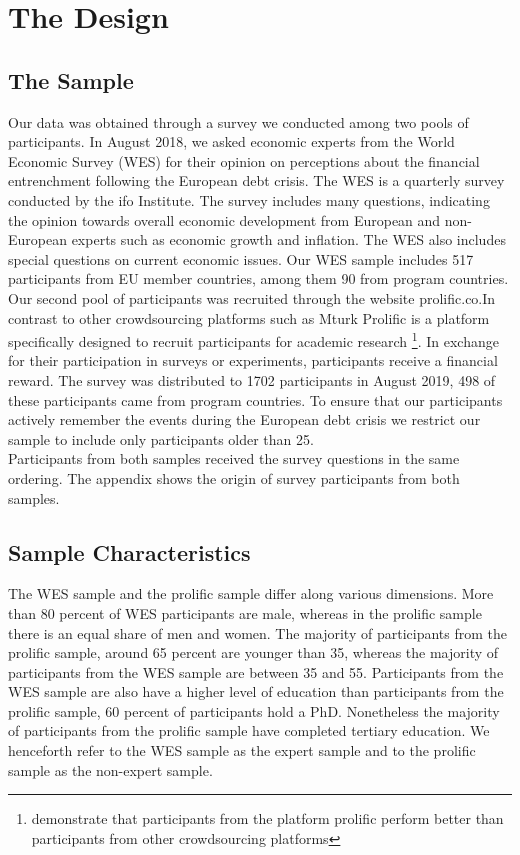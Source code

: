 \section{The Design}
\subsection{The Sample}
Our data was obtained through a survey we conducted among two pools of participants. In August 2018, we asked economic experts from the World Economic Survey (WES) for their opinion on perceptions about the financial entrenchment following the European debt crisis. The WES is a quarterly survey conducted by the ifo Institute. The survey includes many  questions, indicating the opinion towards overall economic development from European and non-European  experts such as economic growth and inflation. The WES also includes special questions on current economic issues. Our WES sample includes 517 participants from EU member countries, among them 90 from program countries.
\\
Our second pool of participants was recruited through the website prolific.co.In contrast to other crowdsourcing platforms such as Mturk Prolific is a platform specifically designed to recruit participants for academic research \footnote{\cite{Peer} demonstrate that participants from the platform prolific perform better than participants from other crowdsourcing platforms}. In exchange for their participation in surveys or experiments, participants receive a financial reward. The survey was distributed to 1702 participants in August 2019, 498 of these participants came from program countries. To ensure that our participants actively remember the events during the European debt crisis we restrict our sample to include only participants older than 25. \\
Participants from both samples received the survey questions in the same ordering. The appendix shows the origin of survey participants from both samples.  
\subsection{Sample Characteristics} 
The WES sample and the prolific sample differ along various dimensions. More than 80 percent of WES participants are male, whereas in the prolific sample there is an equal share of men and women. The majority of participants from the prolific sample, around 65 percent are younger than 35, whereas the majority of participants from the WES sample are between 35 and 55. Participants from the WES sample are also have a higher level of education than participants from the prolific sample, 60 percent of participants hold a PhD. Nonetheless the majority of participants from the prolific sample have completed tertiary education. We henceforth refer to the WES sample as the expert sample and to the prolific sample as the non-expert sample. 
